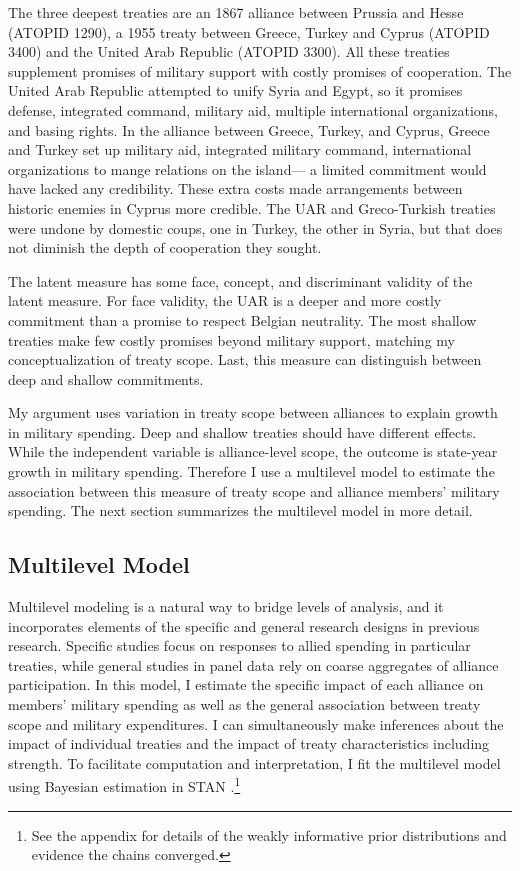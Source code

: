 \documentclass[12pt]{article}
\begin{document}
The three deepest treaties are an 1867 alliance between Prussia and Hesse (ATOPID 1290), a 1955 treaty between Greece, Turkey and Cyprus (ATOPID 3400) and the United Arab Republic (ATOPID 3300).  
All these treaties supplement promises of military support with costly promises of cooperation. 
The United Arab Republic attempted to unify Syria and Egypt, so it promises defense, integrated command, military aid, multiple international organizations, and basing rights. 
In the alliance between Greece, Turkey, and Cyprus, Greece and Turkey set up military aid, integrated military command, international organizations to mange relations on the island--- a limited commitment would have lacked any credibility. 
These extra costs made arrangements between historic enemies in Cyprus more credible. 
The UAR and Greco-Turkish treaties were undone by domestic coups, one in Turkey, the other in Syria, but that does not diminish the depth of cooperation they sought. 


The latent measure has some face, concept, and discriminant validity of the latent measure. 
For face validity, the UAR is a deeper and more costly commitment than a promise to respect Belgian neutrality. 
The most shallow treaties make few costly promises beyond military support, matching my conceptualization of treaty scope. 
Last, this measure can distinguish between deep and shallow commitments. 


My argument uses variation in treaty scope between alliances to explain growth in military spending.
Deep and shallow treaties should have different effects. 
While the independent variable is alliance-level scope, the outcome is state-year growth in military spending. 
Therefore I use a multilevel model to estimate the association between this measure of treaty scope and alliance members' military spending.  
The next section summarizes the multilevel model in more detail. 


\subsection{Multilevel Model} 


Multilevel modeling is a natural way to bridge levels of analysis, and it incorporates elements of the specific and general research designs in previous research. 
Specific studies focus on responses to allied spending in particular treaties, while general studies in panel data rely on coarse aggregates of alliance participation.
In this model, I estimate the specific impact of each alliance on members' military spending as well as the general association between treaty scope and military expenditures. 
I can simultaneously make inferences about the impact of individual treaties and the impact of treaty characteristics including strength. 
To facilitate computation and interpretation, I fit the multilevel model using Bayesian estimation in STAN \citep{Carpenteretal2016}.\footnote{See the appendix for details of the weakly informative prior distributions and evidence the chains converged.}
\end{document}
